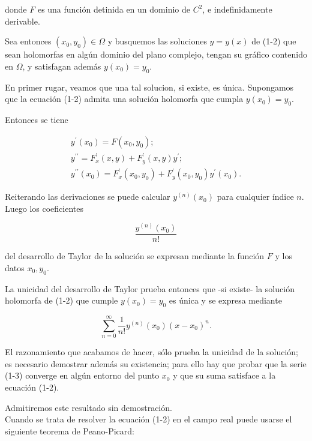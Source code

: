 \documentclass[10pt]{article}
\theoremstyle{plain}
\theoremstyle{definition}
\theoremstyle{remark}
\begin{document}
donde $F$ es una función detinida en un dominio de $C^{2}$, e indefinidamente derivable.

Sea entonces $\left(x_{0}, y_{0}\right) \in \Omega$ y busquemos las soluciones $y=y(x)$ de (1-2) que sean holomorfas en algún dominio del plano complejo, tengan su gráfico contenido en $\Omega$, y satisfagan además $y\left(x_{0}\right)=y_{0}$.

En primer rugar, veamos que una tal solucion, si existe, es única. Supongamos que la ecuación (1-2) admita una solución holomorfa que cumpla $y\left(x_{0}\right)=y_{0}$.

Entonces se tiene

$$
\begin{gathered}
y^{\prime}\left(x_{0}\right)=F\left(x_{0}, y_{0}\right) ; \\
y^{\prime \prime}=F_{x}^{\prime}(x, y)+F_{y}^{\prime}(x, y) y^{\prime} ; \\
y^{\prime \prime}\left(x_{0}\right)=F_{x}^{\prime}\left(x_{0}, y_{0}\right)+F_{y}^{\prime}\left(x_{0}, y_{0}\right) y^{\prime}\left(x_{0}\right) .
\end{gathered}
$$

Reiterando las derivaciones se puede calcular $y^{(n)}\left(x_{0}\right)$ para cualquier índice $n$. Luego los coeficientes

$$
\frac{y^{(n)}\left(x_{0}\right)}{n!}
$$

del desarrollo de Taylor de la solución se expresan mediante la función $F$ y los datos $x_{0}, y_{0}$.

La unicidad del desarrollo de Taylor prueba entonces que -si existe- la solución holomorfa de (1-2) que cumple $y\left(x_{0}\right)=y_{0}$ es única y se expresa mediante


\begin{equation*}
\sum_{n=0}^{\infty} \frac{1}{n!} y^{(n)}\left(x_{0}\right)\left(x-x_{0}\right)^{n} . \tag{1-3}
\end{equation*}


El razonamiento que acabamos de hacer, sólo prueba la unicidad de la solución; es necesario demostrar además su existencia; para ello hay que probar que la serie (1-3) converge en algún entorno del punto $x_{0}$ y que su suma satisface a la ecuación (1-2).

Admitiremos este resultado sin demostración.\\
Cuando se trata de resolver la ecuación (1-2) en el campo real puede usarse el siguiente teorema de Peano-Picard:
\end{document}
